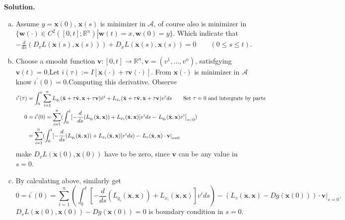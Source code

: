 \documentclass[a4paper]{book}
\newenvironment{solution}%
{\noindent\textbf{Solution.}}%
{\qedhere}
\numberwithin{equation}{chapter}
\theoremstyle{definition}
\begin{document}
\begin{solution}
  \begin{enumerate}[(a)]
  \item Assume $y = \mathbf{x}(0)$, $\mathbf{x}(s)$ is minimizer in $\mathcal{A}$, of course also is minimizer in $\{ \left. \mathbf{w}(\cdot) \in C^2([0,t]; \mathbb{R}^n) \right| \mathbf{w}(t) = x,\mathbf{w}(0) = y\}$. Which indicate that $-\frac{d}{ds}(D_v L(\dot{\mathbf{x}}(s), \mathbf{x}(s))) + D_x L(\dot{\mathbf{x}}(s), \mathbf{x}(s)) = 0 \qquad (0 \leq s \leq t)$.

  \item Choose a smooht function $\mathbf{v} \colon [0,t] \rightarrow \mathbb{R}^n, \mathbf{v} = (v^1, \dots , v^n)$, satisfgying $\mathbf{v}(t) = 0$.Let $i(\tau) := I[\mathbf{x}(\cdot) + \tau \mathbf{v}(\cdot)]$. From $\mathbf{x}(\cdot)$ is minimizer in $\mathcal{A}$ know $i^\prime(0) = 0$.Computing this derivative. Observe
    \begin{equation*}
      \begin{aligned}
        i^\prime (\tau) &= \int_0^t \sum\limits_{i = 1}^n L_{q_i}(\dot{\mathbf{x}} + \tau \dot{\mathbf{v}}, \mathbf{x} + \tau \mathbf{v})\dot{v}^i + L_{x_i}(\dot{\mathbf{x}} + \tau \dot{\mathbf{v}}, \mathbf{x} + \tau \mathbf{v})v^i ds \qquad \textmd{Set } \tau = 0 \textmd{ and intergrate by parts}\\
        0 &= i^\prime(0) = \sum\limits_{i = 1}^n(\int_0^t[-\frac{d}{ds}(L_{q_i}(\dot{\mathbf{x}},\mathbf{x})) + L_{x_i}(\dot{\mathbf{x}},\mathbf{x})]v^i ds - \left. L_{q_i}(\dot{\mathbf{x}},\mathbf{x})v^i \right|_{s = 0}) \\
        &= \sum\limits_{i = 1}^n(\int_0^t[-\frac{d}{ds}(L_{q_i}(\dot{\mathbf{x}},\mathbf{x})) + L_{x_i}(\dot{\mathbf{x}},\mathbf{x})]v^i ds) - \left. L_v(\dot{\mathbf{x}},\mathbf{x})\cdot \mathbf{v} \right|_{s = 0}
      \end{aligned}
    \end{equation*}
    make $D_v L(\dot{\mathbf{x}}(0),\mathbf{x}(0))$ have to be zero, since $\mathbf{v}$ can be any value in $s = 0$.

  \item By calculating above, similarly get
    \begin{equation*}
      0 = i^\prime(0) = \sum\limits_{i = 1}^n(\int_0^t[-\frac{d}{ds}(L_{q_i}(\dot{\mathbf{x}},\mathbf{x})) + L_{x_i}(\dot{\mathbf{x}},\mathbf{x})]v^i ds) - \left. (L_v(\dot{\mathbf{x}},\mathbf{x}) - D g(\mathbf{x}(0)))\cdot \mathbf{v} \right|_{s = 0} .
    \end{equation*}
    $D_v L(\dot{\mathbf{x}}(0),\mathbf{x}(0)) - D g(\mathbf{x}(0)) = 0$ is boundary condition in $s = 0$.
  \end{enumerate}
\end{solution}
\end{document}
